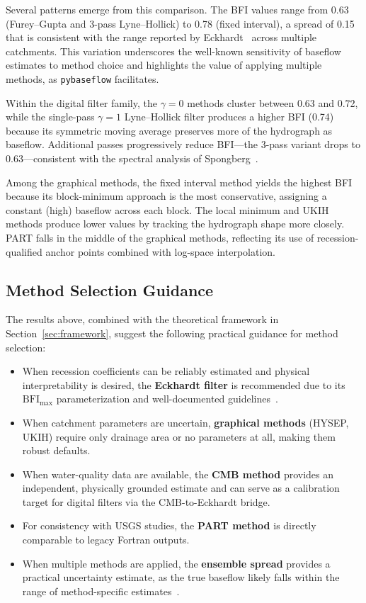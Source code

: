 \documentclass[hydrology,article,submit,pdftex,moreauthors]{Definitions/mdpi}
\begin{document}
Several patterns emerge from this comparison. The BFI values range from 0.63 (Furey--Gupta and 3-pass Lyne--Hollick) to 0.78 (fixed interval), a spread of 0.15 that is consistent with the range reported by Eckhardt~\cite{Eckhardt2008} across multiple catchments. This variation underscores the well-known sensitivity of baseflow estimates to method choice and highlights the value of applying multiple methods, as \texttt{pybaseflow} facilitates.

Within the digital filter family, the $\gamma = 0$ methods cluster between 0.63 and 0.72, while the single-pass $\gamma = 1$ Lyne--Hollick filter produces a higher BFI (0.74) because its symmetric moving average preserves more of the hydrograph as baseflow. Additional passes progressively reduce BFI---the 3-pass variant drops to 0.63---consistent with the spectral analysis of Spongberg~\cite{Spongberg2000}.

Among the graphical methods, the fixed interval method yields the highest BFI because its block-minimum approach is the most conservative, assigning a constant (high) baseflow across each block. The local minimum and UKIH methods produce lower values by tracking the hydrograph shape more closely. PART falls in the middle of the graphical methods, reflecting its use of recession-qualified anchor points combined with log-space interpolation.

\subsection{Method Selection Guidance}
\label{sec:method_guidance}

The results above, combined with the theoretical framework in Section~\ref{sec:framework}, suggest the following practical guidance for method selection:

\begin{itemize}[nosep]
\item When recession coefficients can be reliably estimated and physical interpretability is desired, the \textbf{Eckhardt filter} is recommended due to its $\mathrm{BFI_{max}}$ parameterization and well-documented guidelines~\cite{Eckhardt2005,Collischonn2013}.
\item When catchment parameters are uncertain, \textbf{graphical methods} (HYSEP, UKIH) require only drainage area or no parameters at all, making them robust defaults.
\item When water-quality data are available, the \textbf{CMB method} provides an independent, physically grounded estimate and can serve as a calibration target for digital filters via the CMB-to-Eckhardt bridge.
\item For consistency with USGS studies, the \textbf{PART method} is directly comparable to legacy Fortran outputs.
\item When multiple methods are applied, the \textbf{ensemble spread} provides a practical uncertainty estimate, as the true baseflow likely falls within the range of method-specific estimates~\cite{Eckhardt2008}.
\end{itemize}
\end{document}

